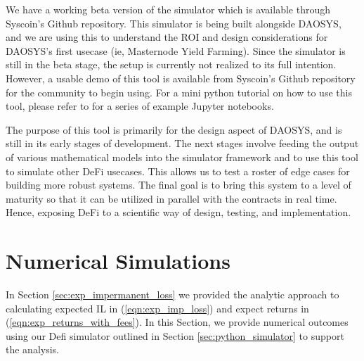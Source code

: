 \documentclass[journal,twocolumn,12pt]{ieeesyscoin}
\begin{document}
We have a working beta version of the simulator which is available through Syscoin’s Github repository. This simulator is being built alongside DAOSYS, and we are using this to understand the ROI and design considerations for DAOSYS’s first usecase (ie, Masternode Yield Farming). Since the simulator is still in the beta stage, the setup is currently not realized to its full intention. However, a usable demo of this tool is available from Syscoin's Github repository for the community to begin using. For a mini python tutorial on how to use this tool, please refer to \cite{Moo22B, DAOSim22} for a series of example Jupyter notebooks.

The purpose of this tool is primarily for the design aspect of DAOSYS, and is still in its early stages of development. The next stages involve feeding the output of various mathematical models into the simulator framework and to use this tool to simulate other DeFi usecases. This allows us to test a roster of edge cases for building more robust systems. The final goal is to bring this system to a level of maturity so that it can be utilized in parallel with the contracts in real time. Hence, exposing DeFi to a scientific way of design, testing, and implementation.


\section{Numerical Simulations}
\label{sec:numerical_simulations}

In Section \ref{sec:exp_impermanent_loss} we provided the analytic approach to calculating expected IL in (\ref{eqn:exp_imp_loss}) and expect returns in (\ref{eqn:exp_returns_with_fees}). In this Section, we provide numerical outcomes using our Defi simulator outlined in Section \ref{sec:python_simulator} to support the analysis.
\end{document}
